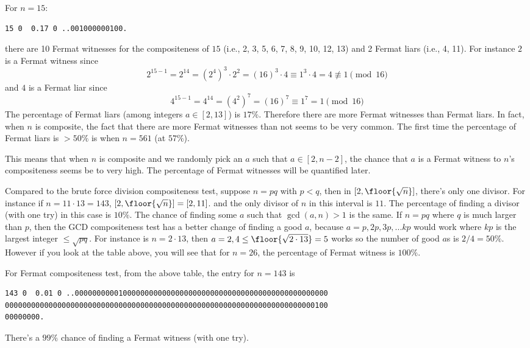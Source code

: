 For $n = 15$:
\begin{Verbatim}[frame=single,fontsize=\footnotesize]
  15 0  0.17 0 ..001000000100.
\end{Verbatim}
there are 10 Fermat witnesses for the compositeness of $15$
(i.e., 2, 3, 5, 6, 7, 8, 9, 10, 12, 13)
and 2 Fermat liars (i.e., 4, 11).
For instance $2$ is a Fermat witness since
\[
2^{15 - 1} = 2^{14} = (2^4)^3 \cdot 2^2 = (16)^3 \cdot 4 \equiv 1^3 \cdot 4 = 4 \not\equiv 1 \pmod{16}
\]
and $4$ is a Fermat liar since
\[
4^{15 - 1} = 4^{14} = (4^2)^7 = (16)^7 \equiv 1^7 = 1 \pmod{16}
\]
The percentage of Fermat liars (among integers $a \in [2, 13]$) is $17\%$.
Therefore there are more Fermat witnesses than Fermat liars.
In fact, when $n$ is composite,
the fact that there are more Fermat witnesses than not seems to be very common.
The first time the percentage of Fermat liars is $> 50\%$ is
when $n = 561$ (at $57\%$).

This means that when $n$ is composite
and we randomly pick an $a$ such that $a \in [2, n-2]$,
the chance that $a$ is a Fermat witness to $n$'s compositeness
seems be to very high.
The percentage of Fermat witnesses will be quantified later.



Compared to the brute force division compositeness test,
suppose $n = pq$ with $p < q$,
then in $[2, \floor{\sqrt{n}}]$, there's only one divisor.
For instance if $n = 11 \cdot 13 = 143$, $[2, \floor{\sqrt{n}}] = [2, 11]$.
and the only divisor of $n$ in this interval is $11$.
The percentage of finding a divisor (with one try) in this case is $10\%$.
The chance of finding some $a$ such that $\gcd(a, n) > 1$ is the same.
If $n = pq$ where $q$ is much larger than $p$, then the GCD compositeness
test has a better change of finding a good $a$, because
$a = p, 2p, 3p, ...kp$ would work where $kp$ is the largest integer
$\leq \sqrt{pq}$.
For instance is $n = 2 \cdot 13$, then $a = 2, 4 \leq \floor{\sqrt{2 \cdot 13}} = 5$ works
so the number of good $a$s is $2/4 = 50\%$.
However if you look at the table above, you will see that for $n = 26$,
the percentage of Fermat witness is $100\%$.

For Fermat compositeness test, from the above table,
the entry for $n = 143$ is
\begin{Verbatim}[frame=single,fontsize=\footnotesize]
143 0  0.01 0 ..0000000000100000000000000000000000000000000000000000000000
00000000000000000000000000000000000000000000000000000000000000000000000100
00000000.
\end{Verbatim}
There's a $99\%$ chance of finding a Fermat witness (with one try).

